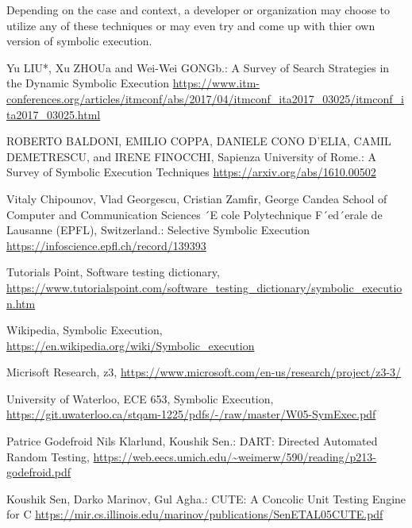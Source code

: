 \documentclass[11pt]{llncs}
\begin{document}
	\vspace{2mm}

	Depending on the case and context, a developer or organization may choose to utilize any of these techniques or may even try and come up with thier own version of symbolic execution.	

	\vspace{5mm}
%
%
%
% 
% 
%
\begin{thebibliography}{9}
Yu LIU*, Xu ZHOUa and Wei-Wei GONGb.:  A Survey of Search Strategies in the Dynamic Symbolic Execution \url{https://www.itm-conferences.org/articles/itmconf/abs/2017/04/itmconf_ita2017_03025/itmconf_ita2017_03025.html}

ROBERTO BALDONI, EMILIO COPPA, DANIELE CONO D’ELIA, CAMIL DEMETRESCU, and IRENE FINOCCHI, Sapienza University of Rome.:  A Survey of Symbolic Execution Techniques \url{https://arxiv.org/abs/1610.00502}

Vitaly Chipounov, Vlad Georgescu, Cristian Zamfir, George Candea School of Computer and Communication Sciences ´E cole Polytechnique F´ed´erale de Lausanne (EPFL), Switzerland.:  Selective Symbolic Execution \url{https://infoscience.epfl.ch/record/139393}

Tutorials Point, Software testing dictionary, \url {https://www.tutorialspoint.com/software_testing_dictionary/symbolic_execution.htm}


Wikipedia, Symbolic Execution, \url {https://en.wikipedia.org/wiki/Symbolic_execution}


Micrisoft Research, z3,  \url {https://www.microsoft.com/en-us/research/project/z3-3/}

University of Waterloo, ECE 653, Symbolic Execution,  \url {https://git.uwaterloo.ca/stqam-1225/pdfs/-/raw/master/W05-SymExec.pdf}

 Patrice Godefroid Nils Klarlund, Koushik Sen.:  DART: Directed Automated Random Testing,  \url {https://web.eecs.umich.edu/~weimerw/590/reading/p213-godefroid.pdf}

 Koushik Sen, Darko Marinov, Gul Agha.:  CUTE: A Concolic Unit Testing Engine for C  \url {https://mir.cs.illinois.edu/marinov/publications/SenETAL05CUTE.pdf}


\end{thebibliography}
\end{document}
